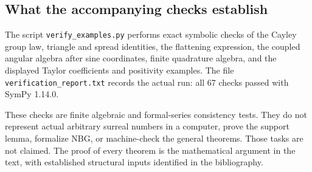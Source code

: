 \documentclass[11pt,letterpaper]{article}
\theoremstyle{definition}
\theoremstyle{remark}
\numberwithin{equation}{section}
\begin{document}
\subsection{What the accompanying checks establish}
The script \texttt{verify\_examples.py} performs exact symbolic checks of the Cayley group law, triangle and spread identities, the flattening expression, the coupled angular algebra after sine coordinates, finite quadrature algebra, and the displayed Taylor coefficients and positivity examples. The file \texttt{verification\_report.txt} records the actual run: all 67 checks passed with SymPy 1.14.0.

These checks are finite algebraic and formal-series consistency tests. They do not represent actual arbitrary surreal numbers in a computer, prove the support lemma, formalize NBG, or machine-check the general theorems. Those tasks are not claimed. The proof of every theorem is the mathematical argument in the text, with established structural inputs identified in the bibliography.
\end{document}
